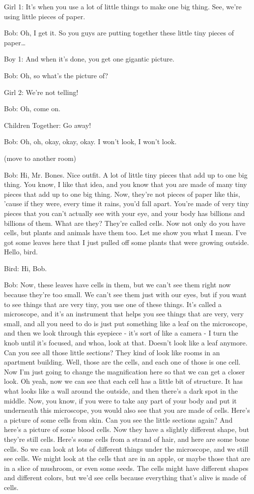 Girl 1: It's when you use a lot of little things to make one big thing. See, we're using little pieces of paper.

Bob: Oh, I get it. So you guys are putting together these little tiny pieces of paper\dots

Boy 1: And when it's done, you get one gigantic picture.

Bob: Oh, so what's the picture of?

Girl 2: We're not telling!

Bob: Oh, come on.

Children Together: Go away!

Bob: Oh, oh, okay, okay, okay. I won't look, I won't look.

(move to another room)

Bob: Hi, Mr. Bones. Nice outfit. A lot of little tiny pieces that add up to one big thing. You know, I like that idea, and you know that you are made of many tiny pieces that add up to one big thing. Now, they're not pieces of paper like this, 'cause if they were, every time it rains, you'd fall apart. You're made of very tiny pieces that you can't actually see with your eye, and your body has billions and billions of them. What are they? They're called cells. Now not only do you have cells, but plants and animals have them too. Let me show you what I mean. I've got some leaves here that I just pulled off some plants that were growing outside. Hello, bird.

Bird: Hi, Bob.

Bob: Now, these leaves have cells in them, but we can't see them right now because they're too small. We can't see them just with our eyes, but if you want to see things that are very tiny, you use one of these things. It's called a microscope, and it's an instrument that helps you see things that are very, very small, and all you need to do is just put something like a leaf on the microscope, and then we look through this eyepiece - it's sort of like a camera - I turn the knob until it's focused, and whoa, look at that. Doesn't look like a leaf anymore. Can you see all those little sections? They kind of look like rooms in an apartment building. Well, those are the cells, and each one of those is one cell. Now I'm just going to change the magnification here so that we can get a closer look. Oh yeah, now we can see that each cell has a little bit of structure. It has what looks like a wall around the outside, and then there's a dark spot in the middle. Now, you know, if you were to take any part of your body and put it underneath this microscope, you would also see that you are made of cells. Here's a picture of some cells from skin. Can you see the little sections again? And here's a picture of some blood cells. Now they have a slightly different shape, but they're still cells. Here's some cells from a strand of hair, and here are some bone cells. So we can look at lots of different things under the microscope, and we still see cells. We might look at the cells that are in an apple, or maybe those that are in a slice of mushroom, or even some seeds. The cells might have different shapes and different colors, but we'd see cells because everything that's alive is made of cells.

